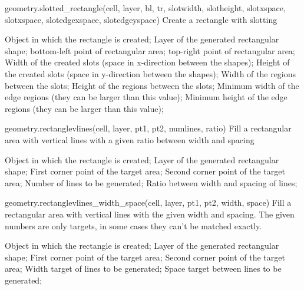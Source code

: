 \begin{APIfunc}{geometry.slotted\_rectangle(cell, layer, bl, tr, slotwidth, slotheight, slotxspace, slotxspace, slotedgexspace, slotedgeyspace)}
    Create a rectangle with slotting
    \begin{APIparameters}
            Object in which the rectangle is created;
            Layer of the generated rectangular shape;
            bottom-left point of rectangular area;
            top-right point of rectangular area;
            Width of the created slots (space in x-direction between the shapes);
            Height of the created slots (space in y-direction between the shapes);
            Width of the regions between the slots;
            Height of the regions between the slots;
            Minimum width of the edge regions (they can be larger than this value);
            Minimum height of the edge regions (they can be larger than this value);
    \end{APIparameters}
\end{APIfunc}
\begin{APIfunc}{geometry.rectanglevlines(cell, layer, pt1, pt2, numlines, ratio)}
    Fill a rectangular area with vertical lines with a given ratio between width and spacing
    \begin{APIparameters}
            Object in which the rectangle is created;
            Layer of the generated rectangular shape;
            First corner point of the target area;
            Second corner point of the target area;
            Number of lines to be generated;
            Ratio between width and spacing of lines;
    \end{APIparameters}
\end{APIfunc}
\begin{APIfunc}{geometry.rectanglevlines\_width\_space(cell, layer, pt1, pt2, width, space)}
    Fill a rectangular area with vertical lines with the given width and spacing. The given numbers are only targets, in some cases they can't be matched exactly.
    \begin{APIparameters}
            Object in which the rectangle is created;
            Layer of the generated rectangular shape;
            First corner point of the target area;
            Second corner point of the target area;
            Width target of lines to be generated;
            Space target between lines to be generated;
    \end{APIparameters}
\end{APIfunc}
